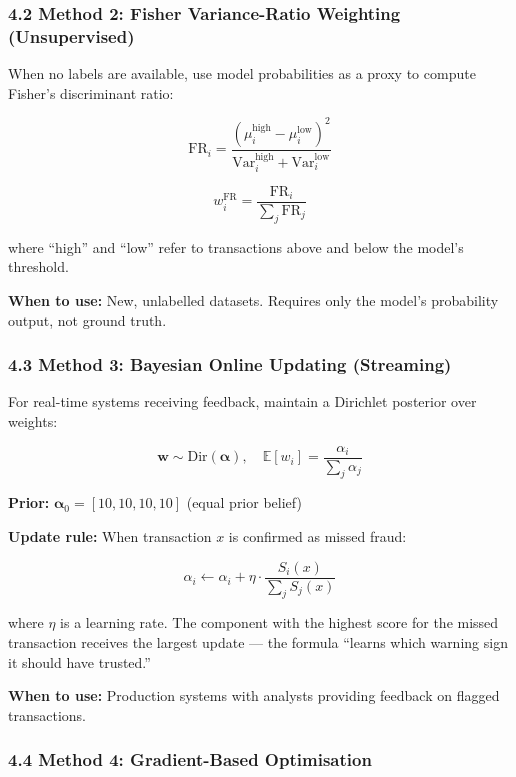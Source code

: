 \documentclass[
  11pt,
]{article}
\begin{document}
\subsubsection{4.2 Method 2: Fisher Variance-Ratio Weighting
(Unsupervised)}\label{method-2-fisher-variance-ratio-weighting-unsupervised}

When no labels are available, use model probabilities as a proxy to
compute Fisher’s discriminant ratio:

\[\text{FR}_i = \frac{(\mu_{i}^{\text{high}} - \mu_{i}^{\text{low}})^2}{\text{Var}_{i}^{\text{high}} + \text{Var}_{i}^{\text{low}}}\]

\[w_i^{\text{FR}} = \frac{\text{FR}_i}{\sum_j \text{FR}_j}\]

where “high” and “low” refer to transactions above and below the model’s
threshold.

\textbf{When to use:} New, unlabelled datasets. Requires only the
model’s probability output, not ground truth.

\subsubsection{4.3 Method 3: Bayesian Online Updating
(Streaming)}\label{method-3-bayesian-online-updating-streaming}

For real-time systems receiving feedback, maintain a Dirichlet posterior
over weights:

\[\mathbf{w} \sim \text{Dir}(\boldsymbol{\alpha}), \quad \mathbb{E}[w_i] = \frac{\alpha_i}{\sum_j \alpha_j}\]

\textbf{Prior:} \(\boldsymbol{\alpha}_0 = [10, 10, 10, 10]\) (equal
prior belief)

\textbf{Update rule:} When transaction \(x\) is confirmed as missed
fraud:

\[\alpha_i \leftarrow \alpha_i + \eta \cdot \frac{S_i(x)}{\sum_j S_j(x)}\]

where \(\eta\) is a learning rate. The component with the highest score
for the missed transaction receives the largest update — the formula
“learns which warning sign it should have trusted.”

\textbf{When to use:} Production systems with analysts providing
feedback on flagged transactions.

\subsubsection{4.4 Method 4: Gradient-Based
Optimisation}\label{method-4-gradient-based-optimisation}
\end{document}
